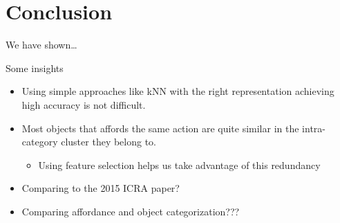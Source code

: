 \section{Conclusion}\label{conclusion}

We have shown\ldots{}

Some insights

\begin{itemize}
\tightlist
\item
  Using simple approaches like kNN with the right representation
  achieving high accuracy is not difficult.
\item
  Most objects that affords the same action are quite similar in the
  intra-category cluster they belong to.

  \begin{itemize}
  \tightlist
  \item
    Using feature selection helps us take advantage of this redundancy
  \end{itemize}
\item
  Comparing to the 2015 ICRA paper?
\item
  Comparing affordance and object categorization???
\end{itemize}
